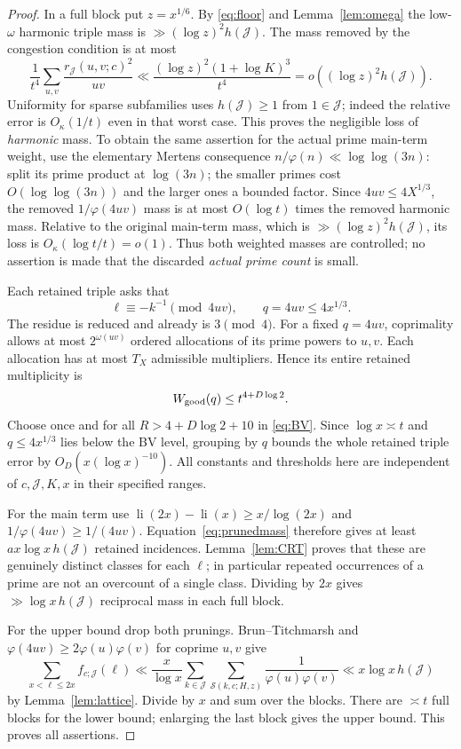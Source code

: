 \documentclass[10pt,reqno]{amsart}
\theoremstyle{remark}
\newcommand{\J}{\mathcal J}
\newcommand{\Sset}{\mathcal S}
\newcommand{\li}{\operatorname{li}}
\begin{document}
\begin{proof}
In a full block put $z=x^{1/6}$.  By \eqref{eq:floor} and
Lemma~\ref{lem:omega} the low-$\omega$ harmonic triple mass is
$\gg(\log z)^2h(\J)$.  The mass removed by the congestion condition is
at most
\begin{equation}\label{eq:prunedmass}
 \frac1{t^4}\sum_{u,v}\frac{r_{\J}(u,v;c)^2}{uv}
 \ll\frac{(\log z)^2(1+\log K)^3}{t^4}
 =o((\log z)^2h(\J)).
\end{equation}
Uniformity for sparse subfamilies uses $h(\J)\geq1$ from $1\in\J$;
indeed the relative error is $O_\kappa(1/t)$ even in that worst case.
This proves the negligible loss of \emph{harmonic} mass.  To obtain the
same assertion for the actual prime main-term weight, use the elementary
Mertens consequence $n/\varphi(n)\ll\log\log(3n)$: split its prime product
at $\log(3n)$; the smaller primes cost $O(\log\log(3n))$ and the larger
ones a bounded factor.  Since $4uv\leq4X^{1/3}$, the removed
$1/\varphi(4uv)$ mass is at most $O(\log t)$ times the removed harmonic
mass.  Relative to the original main-term mass, which is
$\gg(\log z)^2h(\J)$, its loss is $O_\kappa(\log t/t)=o(1)$.
Thus both weighted masses are controlled; no assertion is made that the
discarded \emph{actual prime count} is small.

Each retained triple asks that
\begin{equation}\label{eq:primeAP}
 \ell\equiv-k^{-1}\pmod{4uv},\qquad q=4uv\leq4x^{1/3}.
\end{equation}
The residue is reduced and already is $3\pmod4$.  For a fixed $q=4uv$,
coprimality allows at most $2^{\omega(uv)}$ ordered allocations of its
prime powers to $u,v$.  Each allocation has at most $T_X$ admissible
multipliers.  Hence its entire retained multiplicity is
\begin{equation}\label{eq:Wgood}
 W_{\rm good}(q)\leq t^{4+D\log2}.
\end{equation}
Choose once and for all $R>4+D\log2+10$ in \eqref{eq:BV}.
Since $\log x\asymp t$ and $q\leq4x^{1/3}$ lies below the BV level,
grouping by $q$ bounds the whole retained triple error by
$O_D(x(\log x)^{-10})$.  All constants and thresholds here are independent
of $c,\J,K,x$ in their specified ranges.

For the main term use $\li(2x)-\li(x)\geq x/\log(2x)$ and
$1/\varphi(4uv)\geq1/(4uv)$.  Equation~\eqref{eq:prunedmass} therefore
gives at least $a x\log x\,h(\J)$ retained incidences.  Lemma~\ref{lem:CRT}
proves that these are genuinely distinct classes for each $\ell$; in
particular repeated occurrences of a prime are not an overcount of a
single class.  Dividing by $2x$ gives $\gg\log x\,h(\J)$ reciprocal mass
in each full block.

For the upper bound drop both prunings.  Brun--Titchmarsh and
$\varphi(4uv)\geq2\varphi(u)\varphi(v)$ for coprime $u,v$ give
\[
 \sum_{x<\ell\leq2x} f_{c;\J}(\ell)
 \ll\frac{x}{\log x}\sum_{k\in\J}\sum_{\Sset(k,c;H,z)}
                            \frac1{\varphi(u)\varphi(v)}
 \ll x\log x\,h(\J)
\]
by Lemma~\ref{lem:lattice}.  Divide by $x$ and sum over the blocks.
There are $\asymp t$ full blocks for the lower bound; enlarging the last
block gives the upper bound.  This proves all assertions.
\end{proof}
\end{document}
